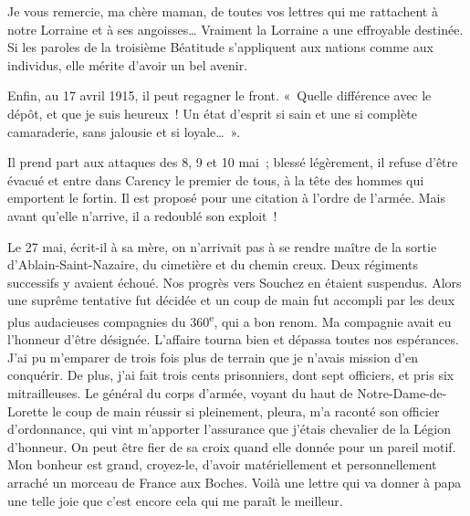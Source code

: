 \documentclass[french,twoside]{book} %
\newenvironment{quoteblock}%
  {\begin{quoting}}
  {\end{quoting}}
\newenvironment{quotebar}{%
    \def\FrameCommand{{\color{rubric!10!}\vrule width 0.5em} \hspace{0.9em}}%
    \def\OuterFrameSep{\itemsep} %
    \MakeFramed {\advance\hsize-\width \FrameRestore}
  }%
  {%
    \endMakeFramed
  }
\renewenvironment{quoteblock}%
  {%
    \savenotes
    \setstretch{0.9}
    \normalfont
    \begin{quotebar}
  }
  {%
    \end{quotebar}
    \spewnotes
  }
\begin{document}
\begin{quoteblock}
 \noindent Je vous remercie, ma chère maman, de toutes vos lettres qui me rattachent à notre Lorraine et à ses angoisses… Vraiment la Lorraine a une effroyable destinée. Si les paroles de la troisième Béatitude s’appliquent aux nations comme aux individus, elle mérite d’avoir un bel avenir.‌
 \end{quoteblock}

\noindent Enfin, au 17 avril 1915, il peut regagner le front. « Quelle différence avec le dépôt, et que je suis heureux ! Un état d’esprit si sain et une si complète camaraderie, sans jalousie et si loyale… ».‌\par
Il prend part aux attaques des 8, 9 et 10 mai ; blessé légèrement, il refuse d’être évacué et entre dans Carency le premier de tous, à la tête des hommes qui emportent le fortin. Il est proposé pour une citation à l’ordre de l’armée. Mais avant qu’elle n’arrive, il a redoublé son exploit !‌\par

\begin{quoteblock}
 \noindent Le 27 mai, écrit-il à sa mère, on n’arrivait pas à se rendre maître de la sortie d’Ablain-Saint-Nazaire, du cimetière et du chemin creux. Deux régiments successifs y avaient échoué. Nos progrès vers Souchez en étaient suspendus. Alors une suprême tentative fut décidée et un coup de main fut accompli par les deux plus audacieuses compagnies du 360\textsuperscript{e}, qui a bon renom. Ma compagnie avait eu l’honneur d’être désignée. L’affaire tourna bien et dépassa toutes nos espérances. J’ai pu m’emparer de trois fois plus de terrain que je n’avais mission d’en conquérir. De plus, j’ai fait trois cents prisonniers, dont sept officiers, et pris six mitrailleuses. Le général du corps d’armée, voyant du haut de Notre-Dame-de-Lorette le coup de main réussir si pleinement, pleura, m’a raconté son officier d’ordonnance, qui vint m’apporter l’assurance que j’étais chevalier de la Légion d’honneur. On peut être fier de sa croix quand elle donnée pour un pareil motif. Mon bonheur est grand, croyez-le, d’avoir matériellement et personnellement arraché un morceau de France aux Boches. Voilà une lettre qui va donner à papa une telle joie que c’est encore cela qui me paraît le meilleur.‌
 \end{quoteblock}
\end{document}
